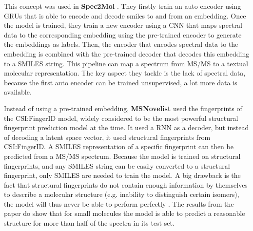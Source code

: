 This concept was used in \textbf{Spec2Mol} \cite{litsa2021spec2mol}. They firstly train an auto encoder using \acp{GRU} that is able to encode and decode smiles to and from an embedding. Once the model is trained, they train a new encoder using a \ac{CNN} that maps spectral data to the corresponding embedding using the pre-trained encoder to generate the embeddings as labels. Then, the encoder that encodes spectral data to the embedding is combined with the pre-trained decoder that decodes this embedding to a SMILES string.
This pipeline can map a spectrum from \ac{MS/MS} to a textual molecular representation. The key aspect they tackle is the lack of spectral data, because the first auto encoder can be trained unsupervised, a lot more data is available.

Instead of using a pre-trained embedding, \textbf{MSNovelist} \cite{stravs2022msnovelist} used the fingerprints of the CSI:FingerID model, widely considered to be the most powerful structural fingerprint prediction model at the time. It used a \ac{RNN} as a decoder, but instead of decoding a latent space vector, it used structural fingerprints from CSI:FingerID. A SMILES representation of a specific fingerprint can then be predicted from a \ac{MS/MS} spectrum. Because the model is trained on structural fingerprints, and any SMILES string can be easily converted to a structural fingerprint, only SMILES are needed to train the model. A big drawback is the fact that structural fingerprints do not contain enough information by themselves to describe a molecular structure (e.g. inability to distinguish certain isomers), the model will thus never be able to perform perfectly \cite{kretschmer2023small}. The results from the paper do show that for small molecules the model is able to predict a reasonable structure for more than half of the spectra in its test set.


